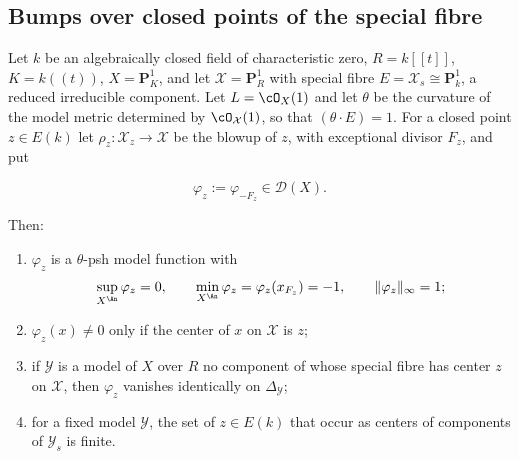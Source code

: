 \subsection{Bumps over closed points of the special fibre}

\begin{lemma}
\label{lem:ch22-bump}
Let \(k\) be an algebraically closed field of characteristic zero,
\(R=k[[t]]\), \(K=k((t))\), \(X=\mathbf P^1_K\), and let
\(\mathcal X=\mathbf P^1_R\) with special fibre \(E=\mathcal X_s\cong
\mathbf P^1_k\), a reduced irreducible component.  Let \(L=\cO_X(1)\) and let
\(\theta\) be the curvature of the model metric determined by
\(\cO_{\mathcal X}(1)\), so that \((\theta\cdot E)=1\).  For a closed point
\(z\in E(k)\) let \(\rho_z:\mathcal X_z\to\mathcal X\) be the blowup of
\(z\), with exceptional divisor \(F_z\), and put

\[
 \varphi_z:=\varphi_{-F_z}\in\mathcal D(X).
\tag{22.69}\label{eq:ch22-bump-function}
\]

Then:
\begin{enumerate}
\item\label{itm:ch22-bump:psh} \(\varphi_z\) is a \(\theta\)-psh model
function with
\[
 \sup_{X^{\An}}\varphi_z=0,
 \qquad
 \min_{X^{\An}}\varphi_z=\varphi_z(x_{F_z})=-1,
 \qquad
 \|\varphi_z\|_\infty=1 ;
\]
\item\label{itm:ch22-bump:support} \(\varphi_z(x)\neq0\) only if the center
of \(x\) on \(\mathcal X\) is \(z\);
\item\label{itm:ch22-bump:invisible} if \(\mathcal Y\) is a model of \(X\)
over \(R\) no component of whose special fibre has center \(z\) on
\(\mathcal X\), then \(\varphi_z\) vanishes identically on
\(\Delta_{\mathcal Y}\);
\item\label{itm:ch22-bump:centers} for a fixed model \(\mathcal Y\), the set
of \(z\in E(k)\) that occur as centers of components of
\(\mathcal Y_s\) is finite.
\end{enumerate}
\end{lemma}

